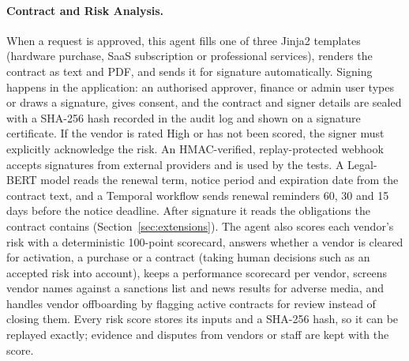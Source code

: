 \paragraph{Contract and Risk Analysis.} When a request is approved, this agent fills one of three Jinja2 templates (hardware purchase, SaaS subscription or professional services), renders the contract as text and PDF, and sends it for signature automatically. Signing happens in the application: an authorised approver, finance or admin user types or draws a signature, gives consent, and the contract and signer details are sealed with a SHA-256 hash recorded in the audit log and shown on a signature certificate. If the vendor is rated High or has not been scored, the signer must explicitly acknowledge the risk. An HMAC-verified, replay-protected webhook accepts signatures from external providers and is used by the tests. A Legal-BERT model reads the renewal term, notice period and expiration date from the contract text, and a Temporal workflow sends renewal reminders 60, 30 and 15 days before the notice deadline. After signature it reads the obligations the contract contains (Section~\ref{sec:extensions}). The agent also scores each vendor's risk with a deterministic 100-point scorecard, answers whether a vendor is cleared for activation, a purchase or a contract (taking human decisions such as an accepted risk into account), keeps a performance scorecard per vendor, screens vendor names against a sanctions list and news results for adverse media, and handles vendor offboarding by flagging active contracts for review instead of closing them. Every risk score stores its inputs and a SHA-256 hash, so it can be replayed exactly; evidence and disputes from vendors or staff are kept with the score.

